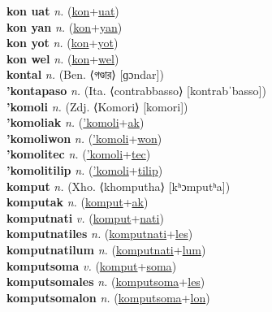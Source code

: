 \textbf{kon uat} \textit{n.} (\hyperref[kon]{kon}+\hyperref[uat]{uat})
 \label{kon uat} \\
\textbf{kon yan} \textit{n.} (\hyperref[kon]{kon}+\hyperref[yan]{yan})
 \label{kon yan} \\
\textbf{kon yot} \textit{n.} (\hyperref[kon]{kon}+\hyperref[yot]{yot})
 \label{kon yot} \\
\textbf{kon wel} \textit{n.} (\hyperref[kon]{kon}+\hyperref[wel]{wel})
 \label{kon wel} \\
\textbf{kontal} \textit{n.} (Ben. ⟨গণ্ডার⟩ [ɡɔndar])
 \label{kontal} \\
\textbf{'kontapaso} \textit{n.} (Ita. ⟨contrabbasso⟩ [kontrabˈbasso])
 \label{'kontapaso} \\
\textbf{'komoli} \textit{n.} (Zdj. ⟨Komori⟩ [komori])
 \label{'komoli} \\
\textbf{'komoliak} \textit{n.} (\hyperref['komoli]{'komoli}+\hyperref[ak]{ak})
 \label{'komoliak} \\
\textbf{'komoliwon} \textit{n.} (\hyperref['komoli]{'komoli}+\hyperref[won]{won})
 \label{'komoliwon} \\
\textbf{'komolitec} \textit{n.} (\hyperref['komoli]{'komoli}+\hyperref[tec]{tec})
 \label{'komolitec} \\
\textbf{'komolitilip} \textit{n.} (\hyperref['komoli]{'komoli}+\hyperref[tilip]{tilip})
 \label{'komolitilip} \\
\textbf{komput} \textit{n.} (Xho. ⟨khomputha⟩ [kʰɔmputʰa])
 \label{komput} \\
\textbf{komputak} \textit{n.} (\hyperref[komput]{komput}+\hyperref[ak]{ak})
 \label{komputak} \\
\textbf{komputnati} \textit{v.} (\hyperref[komput]{komput}+\hyperref[nati]{nati})
 \label{komputnati} \\
\textbf{komputnatiles} \textit{n.} (\hyperref[komputnati]{komputnati}+\hyperref[les]{les})
 \label{komputnatiles} \\
\textbf{komputnatilum} \textit{n.} (\hyperref[komputnati]{komputnati}+\hyperref[lum]{lum})
 \label{komputnatilum} \\
\textbf{komputsoma} \textit{v.} (\hyperref[komput]{komput}+\hyperref[soma]{soma})
 \label{komputsoma} \\
\textbf{komputsomales} \textit{n.} (\hyperref[komputsoma]{komputsoma}+\hyperref[les]{les})
 \label{komputsomales} \\
\textbf{komputsomalon} \textit{n.} (\hyperref[komputsoma]{komputsoma}+\hyperref[lon]{lon})
 \label{komputsomalon} \\

